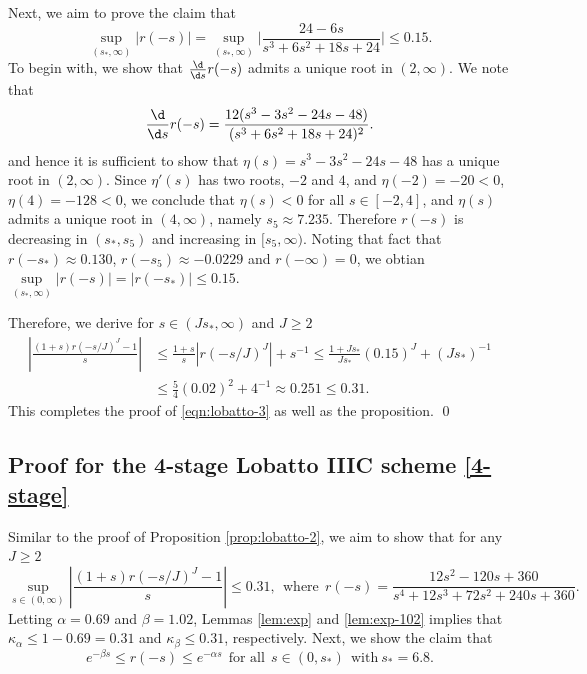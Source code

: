 Next, we aim to prove the claim that
\begin{equation}\label{claim:bound-3}
   \sup\limits_{(s_*, \infty)}
   \big|r(-s)\big| = \sup\limits_{(s_*, \infty)}
   \Big|\frac{24-6s}{s^3 + 6s^2 + 18s + 24}\Big|
   \le  0.15.
\end{equation}
To begin with, we show that $\frac{\d}{\d s}r(-s)$ admits a unique root in $(2, \infty)$. %
We note that
$$\frac{\d}{\d s}r(-s) = \frac{12(s^3-3s^2-24s-48)}
{(s^3 + 6s^2 + 18s + 24)^2}.$$
and hence it is sufficient to show that
$\eta(s) = s^3-3s^2-24s-48$
has a unique root in $(2, \infty)$.
Since $\eta'(s)$ has two roots, $-2$ and $4$,
and $\eta(-2)=-20<0$, $\eta(4)=-128<0$,
we conclude that $\eta(s) <0$ for all $s\in[-2,4]$, and
$\eta(s)$ admits a unique root in $(4, \infty)$,
namely $s_5 \approx 7.235$. %
Therefore $r(-s)$ is decreasing in $(s_*,s_5)$
and increasing in $[s_5,\infty)$.
Noting that fact that $r(-s_*) \approx 0.130$,
$r(-s_5)\approx -0.0229$ and $r(-\infty)=0$, we obtian
$
    \sup\limits_{(s_*, \infty)}
    \big|r(-s)\big| = \big|r(-s_*)\big|
    \le  0.15.
$

Therefore, we derive for $s\in (Js_*,\infty)$ and $J\ge 2$
\begin{equation*}
\begin{split}
    \left|\frac{(1+s) r(-s/J)^J-1}{s}\right|
    &\le \frac{1+s}{s}|r(-s/J)^J|+s^{-1}
    \le \frac{1+Js_*}{Js_*} (0.15)^J + (Js_*)^{-1}    \\
    &\le  \frac{5}{4} (0.02)^2 + 4^{-1}
    \approx 0.251 \le 0.31.
\end{split}
\end{equation*}
This completes the proof of \eqref{eqn:lobatto-3} as well as the proposition.
\qed

\subsection*{Proof for the 4-stage Lobatto IIIC scheme \eqref{4-stage}}
Similar to the proof of Proposition \ref{prop:lobatto-2}, we aim to show that for any $J\ge 2$
\begin{equation}\label{eqn:lobatto-4}
    \sup_{s\in(0,\infty)}  \left|\frac{(1+s) r(-s/J)^J-1}{s}\right| \le 0.31,
    ~~
    \text{where}~~ r(-s) =
    \frac{12s^2-120s+360}{s^4+12s^3+72s^2 + 240s + 360}.
\end{equation}
Letting $\alpha = 0.69$ and $\beta=1.02$,
Lemmas \ref{lem:exp} and \ref{lem:exp-102} implies that
$\kappa_\alpha \le 1-0.69 = 0.31$ and $\kappa_\beta \le 0.31$, respectively. Next, we show the claim that
\begin{equation}\label{claim:sand}
    e^{-\beta s} \le r(-s) \le e^{-\alpha s}~~ \text{for all}~~s\in(0,s_*)~~ \text{with}~s_*=6.8.
\end{equation}

